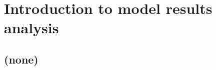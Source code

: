
\cleardoublepage


\chapter{Introduction to model results analysis}\label{ch:results-analysis}

\hfill \break

\newpage

\section{(none)}


